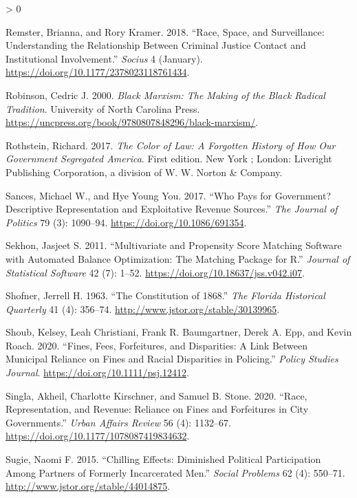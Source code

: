 \documentclass[
  12pt,
]{article}
\newlength{\cslhangindent}
\newenvironment{CSLReferences}[2] %
 {%
  \setlength{\parindent}{0pt}
  \ifodd #1 \everypar{\setlength{\hangindent}{\cslhangindent}}\ignorespaces\fi
  \ifnum #2 > 0
  \setlength{\parskip}{#2\baselineskip}
  \fi
 }%
 {}
\begin{document}
\begin{CSLReferences}{1}{0}
\leavevmode\hypertarget{ref-Remster2018a}{}%
Remster, Brianna, and Rory Kramer. 2018. {``Race, {Space}, and {Surveillance}: {Understanding} the {Relationship} Between {Criminal Justice Contact} and {Institutional Involvement}.''} \emph{Socius} 4 (January). \url{https://doi.org/10.1177/2378023118761434}.

\leavevmode\hypertarget{ref-Robinson2000}{}%
Robinson, Cedric J. 2000. \emph{Black {Marxism}: The {Making} of the {Black Radical Tradition}}. {University of North Carolina Press}. \url{https://uncpress.org/book/9780807848296/black-marxism/}.

\leavevmode\hypertarget{ref-Rothstein2017}{}%
Rothstein, Richard. 2017. \emph{The Color of Law: A Forgotten History of How Our Government Segregated {America}}. First edition. {New York ; London}: {Liveright Publishing Corporation, a division of W. W. Norton \& Company}.

\leavevmode\hypertarget{ref-Sances2017}{}%
Sances, Michael W., and Hye Young You. 2017. {``Who {Pays} for {Government}? {Descriptive Representation} and {Exploitative Revenue Sources}.''} \emph{The Journal of Politics} 79 (3): 1090--94. \url{https://doi.org/10.1086/691354}.

\leavevmode\hypertarget{ref-Sekhon2011}{}%
Sekhon, Jasjeet S. 2011. {``Multivariate and {Propensity Score Matching Software} with {Automated Balance Optimization}: {The Matching} Package for {R}.''} \emph{Journal of Statistical Software} 42 (7): 1--52. \url{https://doi.org/10.18637/jss.v042.i07}.

\leavevmode\hypertarget{ref-Shofner1963}{}%
Shofner, Jerrell H. 1963. {``The {Constitution} of 1868.''} \emph{The Florida Historical Quarterly} 41 (4): 356--74. \url{http://www.jstor.org/stable/30139965}.

\leavevmode\hypertarget{ref-Shoub2020}{}%
Shoub, Kelsey, Leah Christiani, Frank R. Baumgartner, Derek A. Epp, and Kevin Roach. 2020. {``Fines, {Fees}, {Forfeitures}, and {Disparities}: {A Link Between Municipal Reliance} on {Fines} and {Racial Disparities} in {Policing}.''} \emph{Policy Studies Journal}. \url{https://doi.org/10.1111/psj.12412}.

\leavevmode\hypertarget{ref-Singla2020}{}%
Singla, Akheil, Charlotte Kirschner, and Samuel B. Stone. 2020. {``Race, {Representation}, and {Revenue}: {Reliance} on {Fines} and {Forfeitures} in {City Governments}.''} \emph{Urban Affairs Review} 56 (4): 1132--67. \url{https://doi.org/10.1177/1078087419834632}.

\leavevmode\hypertarget{ref-Sugie2015}{}%
Sugie, Naomi F. 2015. {``Chilling {Effects}: {Diminished Political Participation} Among {Partners} of {Formerly Incarcerated Men}.''} \emph{Social Problems} 62 (4): 550--71. \url{http://www.jstor.org/stable/44014875}.


\end{CSLReferences}
\end{document}
